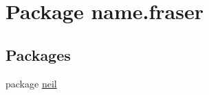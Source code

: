\hypertarget{namespacename_1_1fraser}{}\section{Package name.\+fraser}
\label{namespacename_1_1fraser}
\subsection*{Packages}
\begin{DoxyCompactItemize}
\item 
package \hyperlink{namespacename_1_1fraser_1_1neil}{neil}
\end{DoxyCompactItemize}
